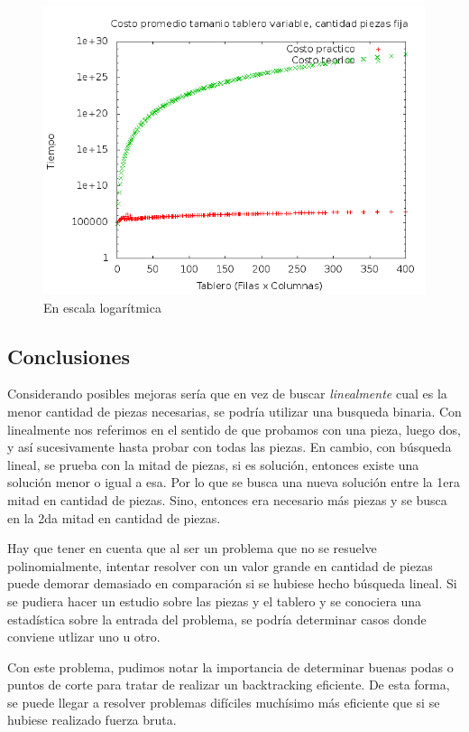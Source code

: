 \begin{figure}[H]
	\centering
	\includegraphics[scale=0.6]{ej4-grafico2.png}
	\caption{ En escala logar\'itmica}
\end{figure}



\subsection{Conclusiones}

\quad Considerando posibles mejoras ser\'ia que en vez de buscar \textit{linealmente} cual es la menor cantidad de piezas necesarias, se podr\'ia utilizar una busqueda binaria. Con linealmente nos referimos en el sentido de que probamos con una pieza, luego dos, y así sucesivamente hasta probar con todas las piezas. En cambio, con b\'usqueda lineal, se prueba con la mitad de piezas, si es soluci\'on, entonces existe una soluci\'on menor o igual a esa. Por lo que se busca una nueva soluci\'on entre la 1era mitad en cantidad de piezas. Sino, entonces era necesario m\'as piezas y se busca en la 2da mitad en cantidad de piezas.

\quad Hay que tener en cuenta que al ser un problema que no se resuelve polinomialmente, intentar resolver con un valor grande en cantidad de piezas puede demorar demasiado en comparaci\'on si se hubiese hecho b\'usqueda lineal. Si se pudiera hacer un estudio sobre las piezas y el tablero y se conociera una estad\'istica sobre la entrada del problema, se podr\'ia determinar casos donde conviene utlizar uno u otro.

\quad Con este problema, pudimos notar la importancia de determinar buenas podas o puntos de corte para tratar de realizar un backtracking eficiente. De esta forma, se puede llegar a resolver problemas dif\'iciles much\'isimo m\'as eficiente que si se hubiese realizado fuerza bruta.
